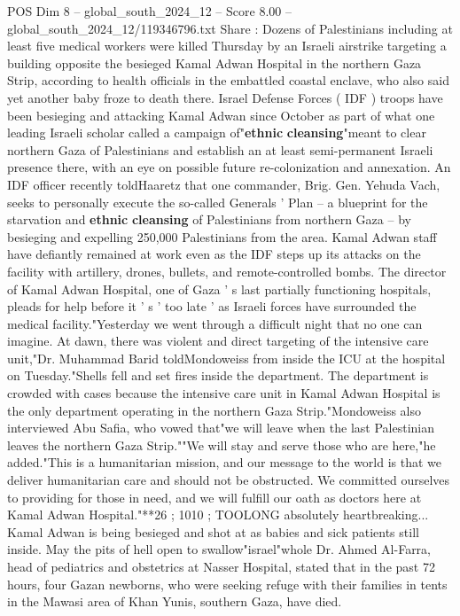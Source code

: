\begin{textsample}{POS Dim 8 – global\_south\_2024\_12 – Score 8.00 – global\_south\_2024\_12/119346796.txt}  \label{ex:f8_pos_069}
Share : Dozens of Palestinians including at least five medical workers were killed Thursday by an Israeli airstrike targeting a building opposite the besieged Kamal Adwan Hospital in the northern Gaza Strip, according to health officials in the embattled coastal enclave, who also said yet another baby froze to death there.
Israel Defense Forces ( IDF ) troops have been besieging and attacking Kamal Adwan since October as part of what one leading Israeli scholar called a campaign of"\textbf{ethnic} \textbf{cleansing}"meant to clear northern Gaza of Palestinians and establish an at least semi-permanent Israeli presence there, with an eye on possible future re-colonization and annexation.
An IDF officer recently toldHaaretz that one commander, Brig.
Gen.
Yehuda Vach, seeks to personally execute the so-called Generals ' Plan -- a blueprint for the starvation and \textbf{ethnic} \textbf{cleansing} of Palestinians from northern Gaza -- by besieging and expelling 250,000 Palestinians from the area.
Kamal Adwan staff have defiantly remained at work even as the IDF steps up its attacks on the facility with artillery, drones, bullets, and remote-controlled bombs.
The director of Kamal Adwan Hospital, one of Gaza ' s last partially functioning hospitals, pleads for help before it ' s ' too late ' as Israeli forces have surrounded the medical facility."Yesterday we went through a difficult night that no one can imagine.
At dawn, there was violent and direct targeting of the intensive care unit,"Dr.
Muhammad Barid toldMondoweiss from inside the ICU at the hospital on Tuesday."Shells fell and set fires inside the department.
The department is crowded with cases because the intensive care unit in Kamal Adwan Hospital is the only department operating in the northern Gaza Strip."Mondoweiss also interviewed Abu Safia, who vowed that"we will leave when the last Palestinian leaves the northern Gaza Strip.""We will stay and serve those who are here,"he added."This is a humanitarian mission, and our message to the world is that we deliver humanitarian care and should not be obstructed.
We committed ourselves to providing for those in need, and we will fulfill our oath as doctors here at Kamal Adwan Hospital."**26 ; 1010 ; TOOLONG absolutely heartbreaking...
Kamal Adwan is being besieged and shot at as babies and sick patients still inside.
May the pits of hell open to swallow"israel"whole Dr.
Ahmed Al-Farra, head of pediatrics and obstetrics at Nasser Hospital, stated that in the past 72 hours, four Gazan newborns, who were seeking refuge with their families in tents in the Mawasi area of Khan Yunis, southern Gaza, have died.

\end{textsample}
